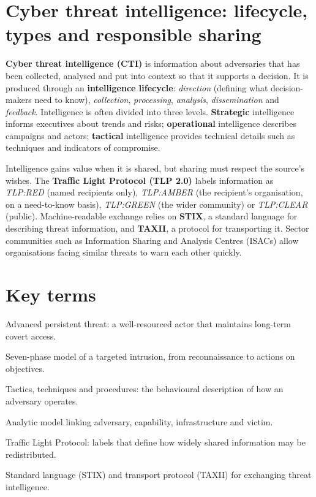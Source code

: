 \section{Cyber threat intelligence: lifecycle, types and responsible sharing}\label{sec:3.6}
\textbf{Cyber threat intelligence (CTI)} is information about adversaries that has been collected, analysed and put into context so that it supports a decision. It is produced through an \textbf{intelligence lifecycle}: \emph{direction} (defining what decision-makers need to know), \emph{collection}, \emph{processing}, \emph{analysis}, \emph{dissemination} and \emph{feedback}. Intelligence is often divided into three levels. \textbf{Strategic} intelligence informs executives about trends and risks; \textbf{operational} intelligence describes campaigns and actors; \textbf{tactical} intelligence provides technical details such as techniques and indicators of compromise.

Intelligence gains value when it is shared, but sharing must respect the source's wishes. The \textbf{Traffic Light Protocol (TLP 2.0)} labels information as \emph{TLP:RED} (named recipients only), \emph{TLP:AMBER} (the recipient's organisation, on a need-to-know basis), \emph{TLP:GREEN} (the wider community) or \emph{TLP:CLEAR} (public). Machine-readable exchange relies on \textbf{STIX}, a standard language for describing threat information, and \textbf{TAXII}, a protocol for transporting it. Sector communities such as Information Sharing and Analysis Centres (ISACs) allow organisations facing similar threats to warn each other quickly.

\section*{Key terms}
\begin{description}[style=nextline,leftmargin=1.2em]
  \item[APT] Advanced persistent threat: a well-resourced actor that maintains long-term covert access.
  \item[Kill Chain] Seven-phase model of a targeted intrusion, from reconnaissance to actions on objectives.
  \item[TTPs] Tactics, techniques and procedures: the behavioural description of how an adversary operates.
  \item[Diamond Model] Analytic model linking adversary, capability, infrastructure and victim.
  \item[TLP] Traffic Light Protocol: labels that define how widely shared information may be redistributed.
  \item[STIX / TAXII] Standard language (STIX) and transport protocol (TAXII) for exchanging threat intelligence.
\end{description}

